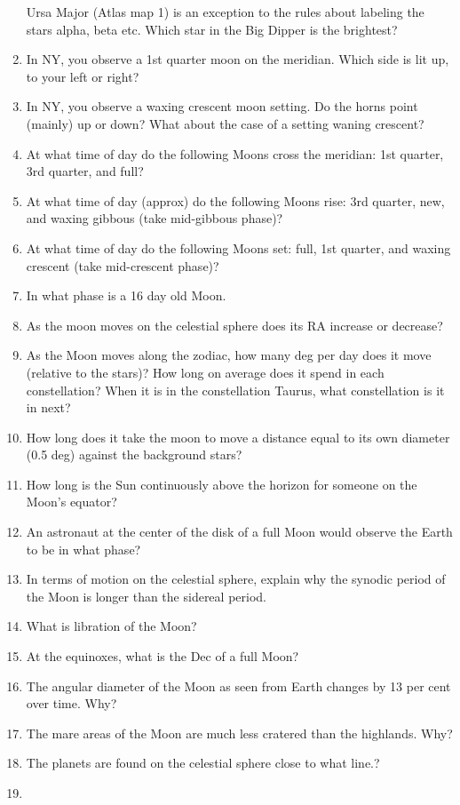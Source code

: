 \documentclass{article}
\begin{document}
\begin{enumerate}
Ursa Major (Atlas map 1) is an exception to the rules about labeling
the stars alpha, beta etc.  Which star in the Big Dipper is the
brightest?
\item 
In NY, you observe a 1st quarter moon on the meridian. Which side is
lit up, to your left or right?
\item 
In NY, you observe a waxing crescent moon setting. Do the horns point
(mainly) up or down?  What about the case of a setting waning crescent?
\item 
At what time of day do the following Moons cross the meridian: 1st
quarter, 3rd quarter, and full?
\item 
At what time of day (approx) do the following Moons rise: 3rd quarter,
new, and waxing gibbous (take mid-gibbous phase)?
\item
At what time of day do the following Moons set: full, 1st quarter, and
waxing crescent (take mid-crescent phase)?
\item
In what phase is a 16 day old Moon.
\item
As the moon moves on the celestial sphere does its RA increase or decrease?
\item
As the Moon moves along the zodiac, how many deg per day does it move
(relative to the stars)?  How long on average does it spend in each
constellation?  When it is in the constellation Taurus, what
constellation is it in next?
\item
How long does it take the moon to move a distance equal to its own
diameter (0.5 deg) against the background stars?
\item
How long is the Sun continuously above the horizon for someone on the
Moon's equator?
\item
An astronaut at the center of the disk of a full Moon would observe
the Earth to be in what phase?
\item
In terms of motion on the celestial sphere, explain why the synodic
period of the Moon is longer than the sidereal period.
\item
What is libration of the Moon?
\item
At the equinoxes, what is the Dec of a full Moon?
\item
The angular diameter of the Moon as seen from Earth changes by 13 per cent
over time. Why?
\item
The mare areas of the Moon are much less cratered than the
highlands. Why?
\item 
The planets are found on the celestial sphere close to what line.?
\item 

\end{enumerate}
\end{document}
